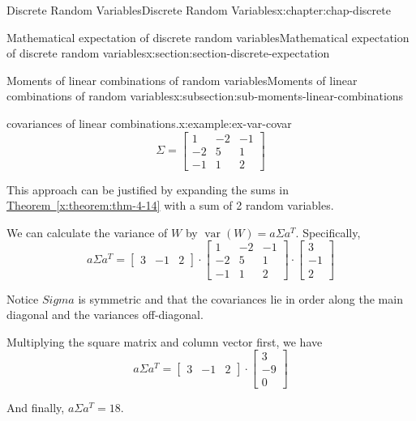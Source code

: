 \documentclass[oneside,10pt,]{book}
\newcommand{\xreffont}{\relax}
\newcommand{\amp}{&}
\begin{document}
\begin{chapterptx}{Discrete Random Variables}{}{Discrete Random Variables}{}{}{x:chapter:chap-discrete}
\begin{sectionptx}{Mathematical expectation of discrete random variables}{}{Mathematical expectation of discrete random variables}{}{}{x:section:section-discrete-expectation}
\begin{subsectionptx}{Moments of linear combinations of random variables}{}{Moments of linear combinations of random variables}{}{}{x:subsection:sub-moments-linear-combinations}
\begin{example}{covariances of linear combinations.}{x:example:ex-var-covar}
\begin{equation*}
\Sigma = \left[\begin{array}{ccc}
1 \amp -2 \amp -1\\
-2 \amp 5 \amp 1\\
-1 \amp 1 \amp 2
\end{array}\right]
\end{equation*}
%
\par
This approach can be justified by expanding the sums in \hyperref[x:theorem:thm-4-14]{Theorem~{\xreffont\ref{x:theorem:thm-4-14}}} with a sum of 2 random variables.%
\par
We can calculate the variance of \(W\) by \(\operatorname{var}(W)
= a\Sigma a^T\). Specifically,%
\begin{equation*}
a \Sigma a^T = \left[\begin{array}{ccc}3 \amp -1 \amp
2\end{array}\right]\cdot\left[\begin{array}{ccc}
1 \amp -2 \amp -1\\
-2 \amp 5 \amp 1\\
-1 \amp 1 \amp 2
\end{array}\right]\cdot\left[\begin{array}{c}3 \\-1\\
2\end{array}\right]
\end{equation*}
%
\par
Notice \(Sigma\) is symmetric and that the covariances lie in order along the main diagonal and the variances off-diagonal.%
\par
Multiplying the square matrix and column vector first, we have%
\begin{equation*}
a \Sigma a^T = \left[\begin{array}{ccc}3 \amp -1 \amp
2\end{array}\right]\cdot\left[\begin{array}{c}3 \\-9\\
0\end{array}\right]
\end{equation*}
%
\par
And finally, \(a \Sigma a^T = 18\).%
\end{example}
\end{subsectionptx}
\end{sectionptx}
\end{chapterptx}
\end{document}
